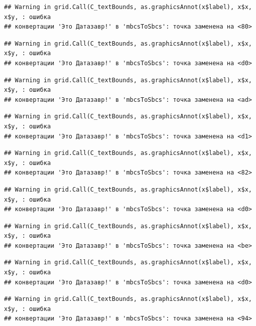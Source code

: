 \documentclass[]{book}
\begin{document}
\begin{verbatim}
## Warning in grid.Call(C_textBounds, as.graphicsAnnot(x$label), x$x, x$y, : ошибка
## конвертации 'Это Датазавр!' в 'mbcsToSbcs': точка заменена на <80>
\end{verbatim}

\begin{verbatim}
## Warning in grid.Call(C_textBounds, as.graphicsAnnot(x$label), x$x, x$y, : ошибка
## конвертации 'Это Датазавр!' в 'mbcsToSbcs': точка заменена на <d0>
\end{verbatim}

\begin{verbatim}
## Warning in grid.Call(C_textBounds, as.graphicsAnnot(x$label), x$x, x$y, : ошибка
## конвертации 'Это Датазавр!' в 'mbcsToSbcs': точка заменена на <ad>
\end{verbatim}

\begin{verbatim}
## Warning in grid.Call(C_textBounds, as.graphicsAnnot(x$label), x$x, x$y, : ошибка
## конвертации 'Это Датазавр!' в 'mbcsToSbcs': точка заменена на <d1>
\end{verbatim}

\begin{verbatim}
## Warning in grid.Call(C_textBounds, as.graphicsAnnot(x$label), x$x, x$y, : ошибка
## конвертации 'Это Датазавр!' в 'mbcsToSbcs': точка заменена на <82>
\end{verbatim}

\begin{verbatim}
## Warning in grid.Call(C_textBounds, as.graphicsAnnot(x$label), x$x, x$y, : ошибка
## конвертации 'Это Датазавр!' в 'mbcsToSbcs': точка заменена на <d0>
\end{verbatim}

\begin{verbatim}
## Warning in grid.Call(C_textBounds, as.graphicsAnnot(x$label), x$x, x$y, : ошибка
## конвертации 'Это Датазавр!' в 'mbcsToSbcs': точка заменена на <be>
\end{verbatim}

\begin{verbatim}
## Warning in grid.Call(C_textBounds, as.graphicsAnnot(x$label), x$x, x$y, : ошибка
## конвертации 'Это Датазавр!' в 'mbcsToSbcs': точка заменена на <d0>
\end{verbatim}

\begin{verbatim}
## Warning in grid.Call(C_textBounds, as.graphicsAnnot(x$label), x$x, x$y, : ошибка
## конвертации 'Это Датазавр!' в 'mbcsToSbcs': точка заменена на <94>
\end{verbatim}
\end{document}
